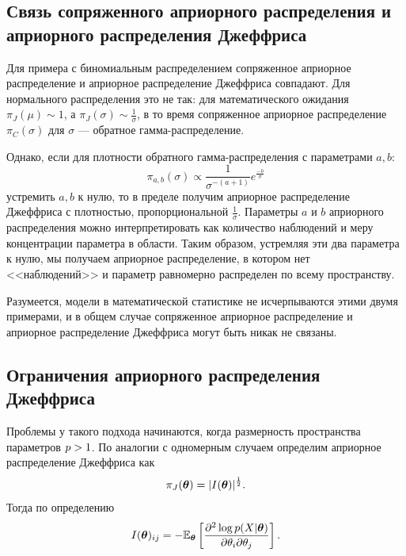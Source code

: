 \subsection{Связь сопряженного априорного распределения и априорного распределения Джеффриса}

Для примера с биномиальным распределением сопряженное априорное распределение и априорное распределение Джеффриса совпадают.
Для нормального распределения это не так: для математического ожидания $\pi_J(\mu) \sim 1$, а $\pi_J(\sigma) \sim \frac{1}{\sigma}$,
в то время сопряженное априорное распределение $\pi_C(\sigma)$ для $\sigma$ --- обратное гамма-распределение.

Однако, если для плотности обратного гамма-распределения с параметрами $a, b$:
\[
\pi_{a, b}(\sigma) \propto \frac1{\sigma^{-(a + 1)}} e^{\frac{-b}{\sigma}}
\]
устремить $a, b$ к нулю, то в пределе получим априорное распределение Джеффриса с плотностью, пропорциональной $\frac{1}{\sigma}$.
Параметры $a$ и $b$ априорного распределения можно интерпретировать как количество наблюдений и меру концентрации параметра в области.
Таким образом, устремляя эти два параметра к нулю, мы получаем априорное распределение, в котором нет <<наблюдений>> и параметр равномерно распределен по всему пространству.

Разумеется, модели в математической статистике не исчерпываются этими двумя примерами, и в общем случае сопряженное априорное распределение и априорное распределение Джеффриса могут быть никак не связаны.

\subsection{Ограничения априорного распределения Джеффриса}

Проблемы у такого подхода начинаются, когда размерность пространства параметров $p > 1$. 
По аналогии с одномерным случаем определим априорное распределение Джеффриса как 
\[
\pi_J(\boldsymbol{\theta}) = |I(\boldsymbol{\theta})|^{\frac12}.
\]
Тогда по определению
\[
I(\boldsymbol{\theta})_{ij} = -\mathbb{E}_{\boldsymbol{\theta}} \left[ \frac{\partial^2 \log p(X | \boldsymbol{\theta})}{\partial \theta_i \partial \theta_j} \right].
\]

